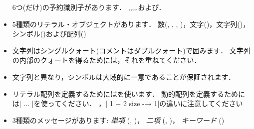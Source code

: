 \documentclass[a4paper,10pt,twoside]{book}
\begin{document}
\begin{itemize}

6つ(だけ)の予約識別子があります．
,,,,,および．

\item		5種類のリテラル・オブジェクトがあります．
		数(, , , )，文字()，文字列()，シンボル()および配列()

\item		文字列はシングルクォート(コメントはダブルクォート)で囲みます．
		文字列の内部のクォートを得るためには，それを重ねてください．

\item		文字列と異なり，シンボルは大域的に一意であることが保証されます．

\item		リテラル配列を定義するためにはを使います．
		動的配列を定義するためには\ct|{ ... }|を使ってください．
		，\ct|{ 1 + 2 } size -→ 1|の違いに注意してください

\item		3種類のメッセージがあります:
		\emph{単項} (\eg {}, )，
		\emph{二項} (\eg {}, )，
		\emph{キーワード} (\eg {})


\end{itemize}
\end{document}
